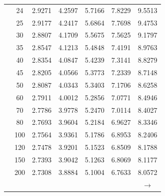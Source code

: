 \begin{minipage}{0.49\textwidth}
\begin{center}
\begin{tabular}{ccccccc}
			& 24 & 2.9271 & 4.2597 & 5.7166 & 7.8229 & 9.5513 \\
			& 25 & 2.9177 & 4.2417 & 5.6864 & 7.7698 & 9.4753 \\
			& 30 & 2.8807 & 4.1709 & 5.5675 & 7.5625 & 9.1797 \\
			& 35 & 2.8547 & 4.1213 & 5.4848 & 7.4191 & 8.9763 \\
			& 40 & 2.8354 & 4.0847 & 5.4239 & 7.3141 & 8.8279 \\
			& 45 & 2.8205 & 4.0566 & 5.3773 & 7.2339 & 8.7148 \\[5pt]
			& 50 & 2.8087 & 4.0343 & 5.3403 & 7.1706 & 8.6258 \\
			& 60 & 2.7911 & 4.0012 & 5.2856 & 7.0771 & 8.4946 \\
			& 70 & 2.7786 & 3.9778 & 5.2470 & 7.0114 & 8.4027 \\
			& 80 & 2.7693 & 3.9604 & 5.2184 & 6.9627 & 8.3346 \\
			& 100 & 2.7564 & 3.9361 & 5.1786 & 6.8953 & 8.2406 \\
			& 120 & 2.7478 & 3.9201 & 5.1523 & 6.8509 & 8.1788 \\
			& 150 & 2.7393 & 3.9042 & 5.1263 & 6.8069 & 8.1177 \\
			& 200 & 2.7308 & 3.8884 & 5.1004 & 6.7633 & 8.0572 \\
			&  &  &  &  &  & $\rightarrow$ \\
		\end{tabular}
	\end{center}
\end{minipage}
\hfill
